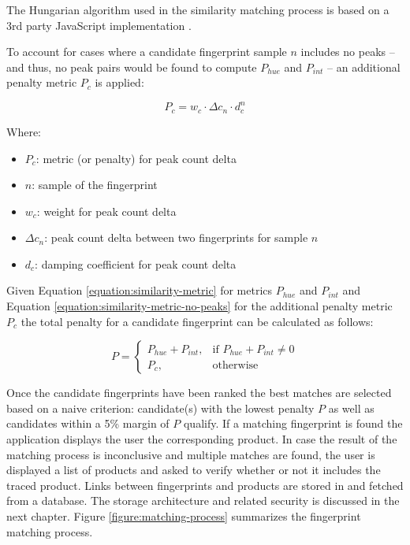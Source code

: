 \documentclass[thesis.tex]{subfiles}
\begin{document}
\noindent The Hungarian algorithm used in the similarity matching process is based on a 3rd party JavaScript implementation \cite{munkres-js}.

To account for cases where a candidate fingerprint sample $n$ includes no peaks -- and thus, no peak pairs would be found to compute $P_{hue}$ and $P_{int}$ -- an additional penalty metric $P_c$ is applied:

\begin{equation}
\label{equation:similarity-metric-no-peaks}
	P_c = w_c \cdot \Delta{c_n} \cdot d_c^n
\end{equation}

Where:
\begin{itemize}[label=]
    \item $P_c$: metric (or penalty) for peak count delta
    \item $n$: sample of the fingerprint
    \item $w_c$: weight for peak count delta
    \item $\Delta{c_n}$: peak count delta between two fingerprints for sample $n$
    \item $d_c$: damping coefficient for peak count delta
\end{itemize}

\noindent Given Equation \ref{equation:similarity-metric} for metrics $P_{hue}$ and $P_{int}$ and Equation \ref{equation:similarity-metric-no-peaks} for the additional penalty metric $P_c$ the total penalty for a candidate fingerprint can be calculated as follows:

\begin{equation}
	P =
	\begin{cases}
	P_{hue} + P_{int}, & \text{if } P_{hue} + P_{int} \neq 0 \\
	P_{c}, & \text{otherwise}
	\end{cases}
\end{equation}

Once the candidate fingerprints have been ranked the best matches are selected based on a naive criterion: candidate(s) with the lowest penalty $P$ as well as candidates within a 5\% margin of $P$ qualify. If a matching fingerprint is found the application displays the user the corresponding product. In case the result of the matching process is inconclusive and multiple matches are found, the user is displayed a list of products and asked to verify whether or not it includes the traced product. Links between fingerprints and products are stored in and fetched from a database. The storage architecture and related security is discussed in the next chapter. Figure \ref{figure:matching-process} summarizes the fingerprint matching process.
\end{document}
